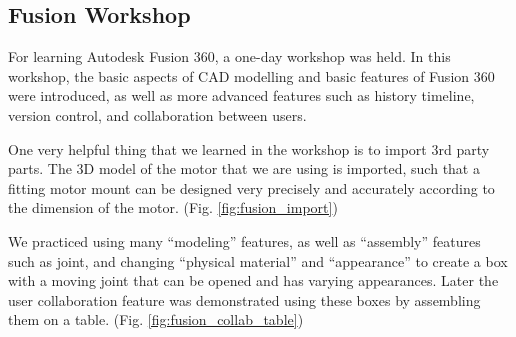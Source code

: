 \subsection{Fusion Workshop}
For learning Autodesk Fusion 360, a one-day workshop was held. In this workshop, the basic aspects of CAD modelling and basic features of Fusion 360 were introduced, as well as more advanced features such as history timeline, version control, and collaboration between users.

One very helpful thing that we learned in the workshop is to import 3rd party parts. The 3D model of the motor that we are using is imported, such that a fitting motor mount can be designed very precisely and accurately according to the dimension of the motor. (Fig. \ref{fig:fusion_import})

We practiced using many “modeling” features, as well as “assembly” features such as joint, and changing “physical material” and “appearance” to create a box with a moving joint that can be opened and has varying appearances. Later the user collaboration feature was demonstrated using these boxes by assembling them on a table. (Fig. \ref{fig:fusion_collab_table})


